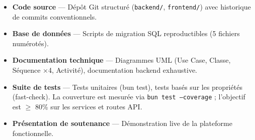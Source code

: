 \documentclass[12pt,a4paper]{article}
\begin{document}
\begin{itemize}[label=\textbullet]
  \item \textbf{Code source} — Dépôt Git structuré (\texttt{backend/}, \texttt{frontend/}) avec historique de commits conventionnels.
  \item \textbf{Base de données} — Scripts de migration SQL reproductibles (5 fichiers numérotés).
  \item \textbf{Documentation technique} — Diagrammes UML (Use Case, Classe, Séquence ×4, Activité), documentation backend exhaustive.
  \item \textbf{Suite de tests} — Tests unitaires (bun test), tests basés sur les propriétés (fast-check). La couverture est mesurée via \texttt{bun test --coverage} ; l'objectif est $\geq$ 80\% sur les services et routes API.
  \item \textbf{Présentation de soutenance} — Démonstration live de la plateforme fonctionnelle.
\end{itemize}
\end{document}
